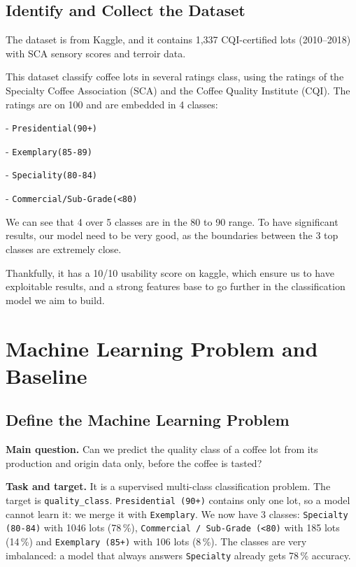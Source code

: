 \documentclass{article}
\begin{document}
\subsection{Identify and Collect the Dataset}

The dataset is from Kaggle, and it contains 1,337 CQI-certified lots (2010–2018) with SCA sensory scores and terroir data.  

This dataset classify coffee lots in several ratings class, using the ratings of the Specialty Coffee Association (SCA) and the Coffee Quality Institute (CQI). The ratings are on 100 and are embedded in 4 classes:  

-  \texttt{Presidential(90+)}  

-  \texttt{Exemplary(85-89)}  

-  \texttt{Speciality(80-84)}  

-  \texttt{Commercial/Sub-Grade(<80)}  

We can see that 4 over 5 classes are in the 80 to 90 range. To have significant results, our model need to be very good, as the boundaries between the 3 top classes are extremely close.

Thankfully, it has a 10/10 usability score on kaggle, which ensure us to have exploitable results, and a strong features base to go further in the classification model we aim to build.  

\section{Machine Learning Problem and Baseline}

\subsection{Define the Machine Learning Problem}

\textbf{Main question.} Can we predict the quality class of a coffee lot from its production and origin data only, before the coffee is tasted?

\textbf{Task and target.} It is a supervised multi-class classification problem. The target is \texttt{quality\_class}. \texttt{Presidential (90+)} contains only one lot, so a model cannot learn it: we merge it with \texttt{Exemplary}. We now have 3 classes: \texttt{Specialty (80-84)} with 1046 lots (78\,\%), \texttt{Commercial / Sub-Grade (<80)} with 185 lots (14\,\%) and \texttt{Exemplary (85+)} with 106 lots (8\,\%). The classes are very imbalanced: a model that always answers \texttt{Specialty} already gets 78\,\% accuracy.
\end{document}

